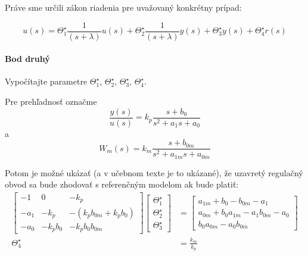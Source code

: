 \documentclass[a4paper, 10pt, ]{article}
\begin{document}
Práve sme určili zákon riadenia pre uvažovaný konkrétny prípad:

\begin{equation}
	u(s) = \Theta_1^\star \frac{1}{(s + \lambda)} u(s) + \Theta_2^\star \frac{1}{(s + \lambda)} y(s) + \Theta_3^\star y(s) + \Theta_4^\star r(s)
\end{equation}








\paragraph{Bod druhý}
\label{vypocetidealparam}



\smallskip

{\color{gray}

Vypočítajte parametre $\Theta_1^\star$, $\Theta_2^\star$, $\Theta_3^\star$, $\Theta_4^\star$.

}

\smallskip

\noindent
Pre prehľadnosť označme
\begin{equation}
	\frac{y(s)}{u(s)} = k_p \frac{s + b_0}{ s^2 + a_1 s + a_0}
\end{equation}
a
\begin{equation} \label{genaralFormOfWm}
	W_m(s) = k_m \frac{s + b_{0m}}{ s^2 + a_{1m} s + a_{0m}}
\end{equation}

Potom je možné ukázať (a v učebnom texte je to ukázané), že uzavretý regulačný obvod sa bude zhodovať s referenčným modelom ak bude platiť:
\begin{subequations}
\begin{align}
	\begin{bmatrix}
		-1 & 0 & -k_p \\
		-a_1 & -k_p & -(k_p b_{0m} + k_p b_0) \\
		-a_0 & -k_p b_0 & -k_p b_0 b_{0m}
	\end{bmatrix}
	\begin{bmatrix}
    	  \Theta_1^\star \\
		  \Theta_2^\star \\
		  \Theta_3^\star
 	\end{bmatrix}
	&=
	\begin{bmatrix}
    	a_{1m} + b_0 - b_{0m} - a_1 \\
    	a_{0m} + b_0 a_{1m} - a_1 b_{0m} - a_0 \\
    	b_0 a_{0m} - a_0 b_{0m}
  	\end{bmatrix} \\
	\Theta_4^\star &= \frac{k_m}{k_p}
\end{align}
\end{subequations}
\end{document}
